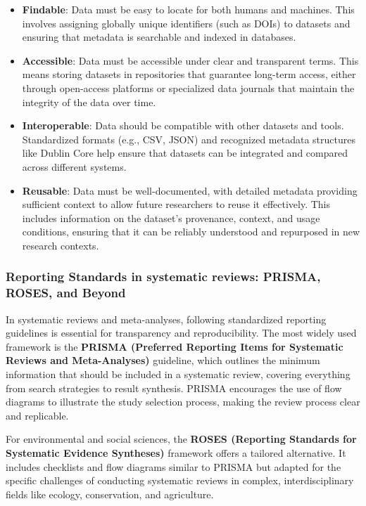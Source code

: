 \documentclass[
]{book}
\begin{document}
\begin{itemize}
\item
  \textbf{Findable}: Data must be easy to locate for both humans and machines.
  This involves assigning globally unique identifiers (such as DOIs) to datasets and ensuring that metadata is searchable and indexed in databases.
\item
  \textbf{Accessible}: Data must be accessible under clear and transparent terms.
  This means storing datasets in repositories that guarantee long-term access, either through open-access platforms or specialized data journals that maintain the integrity of the data over time.
\item
  \textbf{Interoperable}: Data should be compatible with other datasets and tools.
  Standardized formats (e.g., CSV, JSON) and recognized metadata structures like Dublin Core help ensure that datasets can be integrated and compared across different systems.
\item
  \textbf{Reusable}: Data must be well-documented, with detailed metadata providing sufficient context to allow future researchers to reuse it effectively.
  This includes information on the dataset's provenance, context, and usage conditions, ensuring that it can be reliably understood and repurposed in new research contexts.
\end{itemize}

\subsubsection{Reporting Standards in systematic reviews: PRISMA, ROSES, and Beyond}\label{reporting-standards-in-systematic-reviews-prisma-roses-and-beyond}

In systematic reviews and meta-analyses, following standardized reporting guidelines is essential for transparency and reproducibility.
The most widely used framework is the \textbf{PRISMA (Preferred Reporting Items for Systematic Reviews and Meta-Analyses)} guideline, which outlines the minimum information that should be included in a systematic review, covering everything from search strategies to result synthesis.
PRISMA encourages the use of flow diagrams to illustrate the study selection process, making the review process clear and replicable.

For environmental and social sciences, the \textbf{ROSES (Reporting Standards for Systematic Evidence Syntheses)} framework offers a tailored alternative.
It includes checklists and flow diagrams similar to PRISMA but adapted for the specific challenges of conducting systematic reviews in complex, interdisciplinary fields like ecology, conservation, and agriculture.
\end{document}
